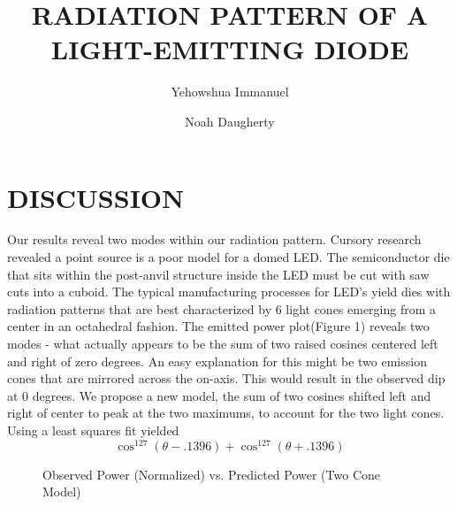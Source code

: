 \documentclass[10pt,a4paper]{article}
\title{RADIATION PATTERN OF A LIGHT-EMITTING DIODE}
\author{Yehowshua Immanuel \and Noah Daugherty}
\begin{document}
\maketitle
\tableofcontents
\newpage





\newpage
\section{DISCUSSION}
Our results reveal two modes within our radiation pattern. Cursory research revealed a point source is a poor model for a domed LED. The semiconductor die that sits within the post-anvil structure inside the LED must be cut with saw cuts into a cuboid. The typical manufacturing processes for LED’s yield dies with radiation patterns that are best characterized by 6 light cones emerging from a center in an octahedral fashion. The emitted power plot(Figure 1) reveals two modes - what actually appears to be the sum of two raised cosines centered left and right of zero degrees. An easy explanation for this might be two emission cones that are mirrored across the on-axis. This would result in the observed dip at 0 degrees. We propose a new model, the sum of two cosines shifted left and right of center to peak at the two maximums, to account for the two light cones. Using a least squares fit yielded
\[\cos^{127}(\theta-.1396) + \cos^{127}(\theta+.1396)\]

\begin{figure}[H]
    \centering
{}
\caption{Observed Power (Normalized) vs. \newline Predicted Power (Two Cone Model)}
\end{figure}

\newpage

\end{document}
